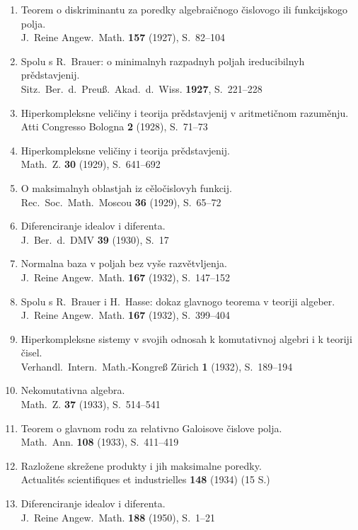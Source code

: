 \documentclass[11pt]{article}
\newcommand{\foreign}[1]{#1}
\begin{document}
\begin{enumerate}[label={\small\arabic*.},leftmargin=2em,itemsep=0.3em]
\item Teorem o diskriminantu za poredky algebraičnogo čislovogo ili funkcijskogo polja.\\
\foreign{J.\ Reine Angew.\ Math.} \textbf{157} (1927), S.~82--104

\item Spolu s R.\ Brauer: o minimalnyh razpadnyh poljah ireducibilnyh prědstavjenij.\\
\foreign{Sitz.\ Ber.\ d.\ Preuß.\ Akad.\ d.\ Wiss.} \textbf{1927}, S.~221--228

\item Hiperkompleksne veličiny i teorija prědstavjenij v aritmetičnom razuměnju.\\
\foreign{Atti Congresso Bologna} \textbf{2} (1928), S.~71--73

\item Hiperkompleksne veličiny i teorija prědstavjenij.\\
\foreign{Math.\ Z.} \textbf{30} (1929), S.~641--692

\item O maksimalnyh oblastjah iz cěločislovyh funkcij.\\
\foreign{Rec.\ Soc.\ Math.\ Moscou} \textbf{36} (1929), S.~65--72

\item Diferenciranje idealov i diferenta.\\
\foreign{J.\ Ber.\ d.\ DMV} \textbf{39} (1930), S.~17

\item Normalna baza v poljah bez vyše razvětvljenja.\\
\foreign{J.\ Reine Angew.\ Math.} \textbf{167} (1932), S.~147--152

\item Spolu s R.\ Brauer i H.\ Hasse: dokaz glavnogo teorema v teoriji algeber.\\
\foreign{J.\ Reine Angew.\ Math.} \textbf{167} (1932), S.~399--404

\item Hiperkompleksne sistemy v svojih odnosah k komutativnoj algebri i k teoriji čisel.\\
\foreign{Verhandl.\ Intern.\ Math.-Kongreß Zürich} \textbf{1} (1932), S.~189--194

\item Nekomutativna algebra.\\
\foreign{Math.\ Z.} \textbf{37} (1933), S.~514--541

\item Teorem o glavnom rodu za relativno Galoisove čislove polja.\\
\foreign{Math.\ Ann.} \textbf{108} (1933), S.~411--419

\item Razložene skrežene produkty i jih maksimalne poredky.\\
\foreign{Actualités scientifiques et industrielles} \textbf{148} (1934) (15 S.)

\item Diferenciranje idealov i diferenta.\\
\foreign{J.\ Reine Angew.\ Math.} \textbf{188} (1950), S.~1--21
\end{enumerate}
\end{document}
